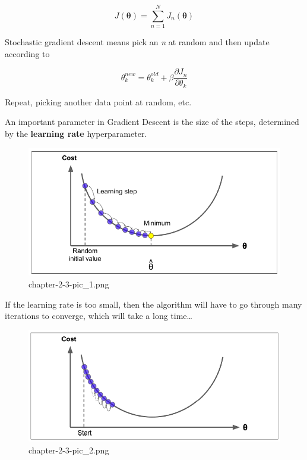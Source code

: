 \documentclass[11pt]{article}
\begin{document}
\begin{equation}
J(\mathbf{\theta}) = \sum\limits_{n=1}^N J_n(\mathbf{\theta})
\end{equation}

Stochastic gradient descent means pick an \emph{n} at random and then
update according to

\begin{equation}
\theta_k^{new} =\theta_k^{old}+\beta \frac{\partial J_n}{\partial \theta_k}
\end{equation}

Repeat, picking another data point at random, etc.

    An important parameter in Gradient Descent is the size of the steps,
determined by the \textbf{learning rate} hyperparameter.

    \begin{figure}
\centering
\includegraphics{./pic/chapter-2-3-pic_1.png}
\caption{chapter-2-3-pic\_1.png}
\end{figure}

    If the learning rate is too small, then the algorithm will have to go
through many iterations to converge, which will take a long time\ldots{}

    \begin{figure}
\centering
\includegraphics{./pic/chapter-2-3-pic_2.png}
\caption{chapter-2-3-pic\_2.png}
\end{figure}
\end{document}

